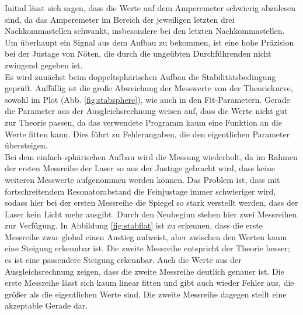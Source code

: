 Initial lässt sich sagen, dass die Werte auf dem Amperemeter schwierig abzulesen sind, da das Amperemeter im Bereich der jeweiligen letzten drei Nachkommastellen schwankt, insbesondere bei den letzten Nachkommastellen.
Um überhaupt ein Signal aus dem Aufbau zu bekommen, ist eine hohe Präzision bei der Justage von Nöten, die durch die ungeübten Durchführenden nicht zwingend gegeben ist.\\
Es wird zunächst beim doppeltsphärischen Aufbau die Stabilitätsbedingung geprüft.
Auffällig ist die große Abweichung der Messwerte von der Theoriekurve, sowohl im Plot (Abb. \ref{fig:stabsphere}), wie auch in den Fit-Parametern.
Gerade die Parameter aus der Ausgleichsrechnung weisen auf, dass die Werte nicht gut zur Theorie passen, da das verwendete Programm kaum eine Funktion an die Werte fitten kann.
Dies führt zu Fehlerangaben, die den eigentlichen Parameter übersteigen.\\
Bei dem einfach-sphärischen Aufbau wird die Messung wiederholt, da im Rahmen der ersten Messreihe der Laser so aus der Justage gebracht wird, dass keine weiteren Messwerte aufgenommen werden können.
Das Problem ist, dass mit fortschreitendem Resonatorabstand die Feinjustage immer schwieriger wird, sodass hier bei der ersten Messreihe die Spiegel so stark verstellt werden, dass der Laser kein Licht mehr ausgibt.
Durch den Neubeginn stehen hier zwei Messreihen zur Verfügung.
In Abbildung \ref{fig:stabflat} ist zu erkennen, dass die erste Messreihe zwar global einen Anstieg aufweist, aber zwischen den Werten kaum eine Steigung erkennbar ist.
Die zweite Messreihe entspricht der Theorie besser; es ist eine passendere Steigung erkennbar.
Auch die Werte aus der Ausgleichsrechnung zeigen, dass die zweite Messreihe deutlich genauer ist.
Die erste Messreihe lässt sich kaum linear fitten und gibt auch wieder Fehler aus, die größer als die eigentlichen Werte sind.
Die zweite Messreihe dagegen stellt eine akzeptable Gerade dar.\\
